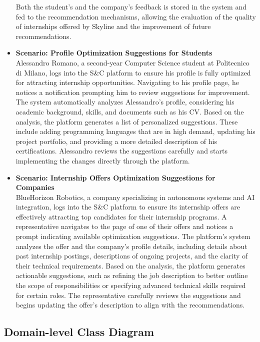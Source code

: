 \begin{itemize}
        Both the student's and the company’s feedback is stored in the system and fed to the recommendation mechanisms, allowing the evaluation of the quality of internships offered by Skyline and the improvement of future recommendations. 
        \incscenario
    \item \textbf{\nth{\thescenario} Scenario: Profile Optimization Suggestions for Students}
    \\
        Alessandro Romano, a second-year Computer Science student at Politecnico di Milano, logs into the S\&C platform to ensure his profile is fully optimized for attracting internship opportunities. Navigating to his profile page, he notices a notification prompting him to review suggestions for improvement.
        The system automatically analyzes Alessandro’s profile, considering his academic background, skills, and documents such as his CV. Based on the analysis, the platform generates a list of personalized suggestions. These include adding programming languages that are in high demand, updating his project portfolio, and providing a more detailed description of his certifications.
        Alessandro reviews the suggestions carefully and starts implementing the changes directly through the platform.
        \incscenario
    \item \textbf{\nth{\thescenario} Scenario: Internship Offers Optimization Suggestions for Companies}
    \\
        BlueHorizon Robotics, a company specializing in autonomous systems and AI integration, logs into the S\&C platform to ensure its internship offers are effectively attracting top candidates for their internship programs. A representative navigates to the page of one of their offers and notices a prompt indicating available optimization suggestions.
        The platform’s system analyzes the offer and the company's profile details, including details about past internship postings, descriptions of ongoing projects, and the clarity of their technical requirements. Based on the analysis, the platform generates actionable suggestions, such as refining the job description to better outline the scope of responsibilities or specifying advanced technical skills required for certain roles.
        The representative carefully reviews the suggestions and begins updating the offer's description to align with the recommendations.
        \incscenario
\end{itemize}

\subsection{Domain-level Class Diagram}
\label{subsec:domain_level_class_diagrams}

